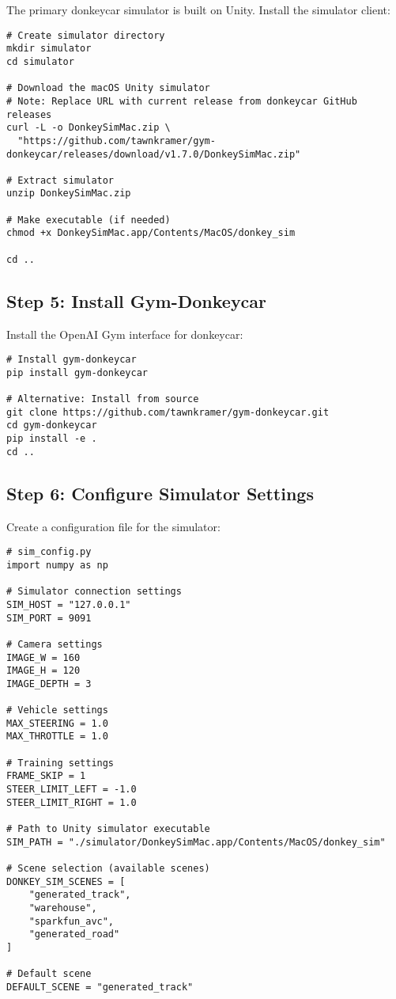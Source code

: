 \documentclass[11pt,a4paper]{article}
\begin{document}
The primary donkeycar simulator is built on Unity. Install the simulator client:

\begin{lstlisting}[style=bashstyle, caption={Download and Setup Unity Simulator}]
# Create simulator directory
mkdir simulator
cd simulator

# Download the macOS Unity simulator
# Note: Replace URL with current release from donkeycar GitHub releases
curl -L -o DonkeySimMac.zip \
  "https://github.com/tawnkramer/gym-donkeycar/releases/download/v1.7.0/DonkeySimMac.zip"

# Extract simulator
unzip DonkeySimMac.zip

# Make executable (if needed)
chmod +x DonkeySimMac.app/Contents/MacOS/donkey_sim

cd ..
\end{lstlisting}

\subsection{Step 5: Install Gym-Donkeycar}

Install the OpenAI Gym interface for donkeycar:

\begin{lstlisting}[style=bashstyle, caption={Install Gym-Donkeycar}]
# Install gym-donkeycar
pip install gym-donkeycar

# Alternative: Install from source
git clone https://github.com/tawnkramer/gym-donkeycar.git
cd gym-donkeycar
pip install -e .
cd ..
\end{lstlisting}

\subsection{Step 6: Configure Simulator Settings}

Create a configuration file for the simulator:

\begin{lstlisting}[style=pythonstyle, caption={Create simulator configuration (sim\_config.py)}]
# sim_config.py
import numpy as np

# Simulator connection settings
SIM_HOST = "127.0.0.1"
SIM_PORT = 9091

# Camera settings
IMAGE_W = 160
IMAGE_H = 120
IMAGE_DEPTH = 3

# Vehicle settings
MAX_STEERING = 1.0
MAX_THROTTLE = 1.0

# Training settings
FRAME_SKIP = 1
STEER_LIMIT_LEFT = -1.0
STEER_LIMIT_RIGHT = 1.0

# Path to Unity simulator executable
SIM_PATH = "./simulator/DonkeySimMac.app/Contents/MacOS/donkey_sim"

# Scene selection (available scenes)
DONKEY_SIM_SCENES = [
    "generated_track",
    "warehouse",
    "sparkfun_avc",
    "generated_road"
]

# Default scene
DEFAULT_SCENE = "generated_track"
\end{lstlisting}
\end{document}
